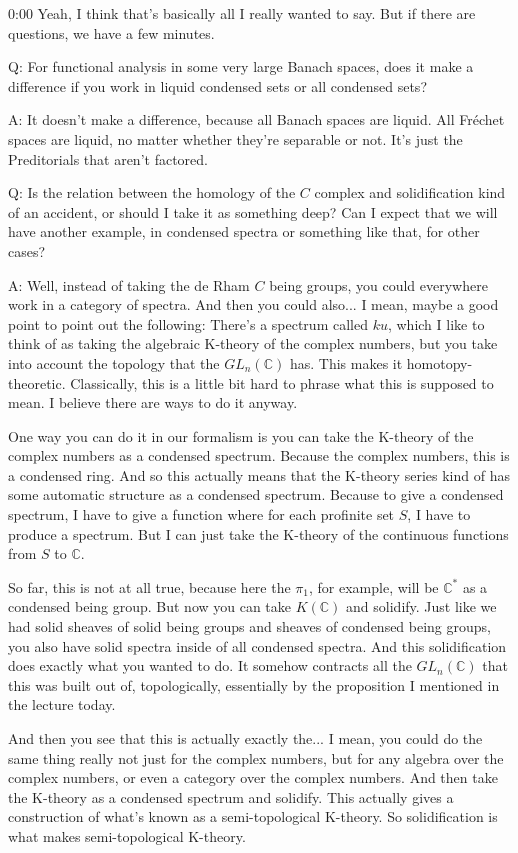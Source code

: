 \begin{unfinished}{0:00}
Yeah, I think that's basically all I really wanted to say. But if there are questions, we have a few minutes.

Q: For functional analysis in some very large Banach spaces, does it make a difference if you work in liquid condensed sets or all condensed sets?

A: It doesn't make a difference, because all Banach spaces are liquid. All Fréchet spaces are liquid, no matter whether they're separable or not. It's just the Preditorials that aren't factored.

Q: Is the relation between the homology of the $C$ complex and solidification kind of an accident, or should I take it as something deep? Can I expect that we will have another example, in condensed spectra or something like that, for other cases?

A: Well, instead of taking the de Rham $C$ being groups, you could everywhere work in a category of spectra. And then you could also... I mean, maybe a good point to point out the following: There's a spectrum called $ku$, which I like to think of as taking the algebraic K-theory of the complex numbers, but you take into account the topology that the $GL_n(\mathbb{C})$ has. This makes it homotopy-theoretic. Classically, this is a little bit hard to phrase what this is supposed to mean. I believe there are ways to do it anyway.

One way you can do it in our formalism is you can take the K-theory of the complex numbers as a condensed spectrum. Because the complex numbers, this is a condensed ring. And so this actually means that the K-theory series kind of has some automatic structure as a condensed spectrum. Because to give a condensed spectrum, I have to give a function where for each profinite set $S$, I have to produce a spectrum. But I can just take the K-theory of the continuous functions from $S$ to $\mathbb{C}$.

So far, this is not at all true, because here the $\pi_1$, for example, will be $\mathbb{C}^*$ as a condensed being group. But now you can take $K(\mathbb{C})$ and solidify. Just like we had solid sheaves of solid being groups and sheaves of condensed being groups, you also have solid spectra inside of all condensed spectra. And this solidification does exactly what you wanted to do. It somehow contracts all the $GL_n(\mathbb{C})$ that this was built out of, topologically, essentially by the proposition I mentioned in the lecture today.

And then you see that this is actually exactly the... I mean, you could do the same thing really not just for the complex numbers, but for any algebra over the complex numbers, or even a category over the complex numbers. And then take the K-theory as a condensed spectrum and solidify. This actually gives a construction of what's known as a semi-topological K-theory. So solidification is what makes semi-topological K-theory.


\end{unfinished}
